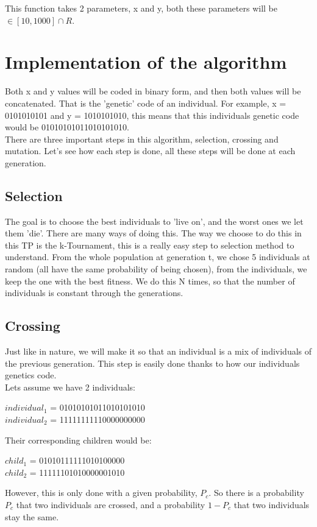 \documentclass[a4paper]{article}
\begin{document}
This function takes 2 parameters, x and y, both these parameters will be $\in [10,1000] \cap R$.

\section{Implementation of the algorithm}
Both x and y values will be coded in binary form, and then both values will be concatenated. That is the 'genetic' code of an individual. For example, {\color{red}x = 0101010101} and {\color{blue}y = 1010101010}, this means that this individuals genetic code would be {\color{red}0101010101}{\color{blue}1010101010}.\\
There are three important steps in this algorithm, selection, crossing and mutation. Let's see how each step is done, all these steps will be done at each generation.
\subsection{Selection}
The goal is to choose the best individuals to 'live on', and the worst ones we let them 'die'. There are many ways of doing this. The way we choose to do this in this TP is the k-Tournament, this is a really easy step to selection method to understand. From the whole population at generation t, we chose 5 individuals at random (all have the same probability of being chosen), from the individuals, we keep the one with the best fitness. We do this N times, so that the number of individuals is constant through the generations.
\subsection{Crossing}
Just like in nature, we will make it so that an individual is a mix of individuals of the previous generation. This step is easily done thanks to how our individuals genetics code.\\
Lets assume we have 2 individuals:\\
\begin{center}
$individual_1$ = {\color{red}0101010101}{\color{blue}1010101010}\\
$individual_2$ = {\color{purple}1111111111}{\color{brown}0000000000}\\
\end{center}
Their corresponding children would be:
\begin{center}
$child_1$ = {\color{red}01010}{\color{purple}11111}{\color{blue}10101}{\color{brown}00000}\\
$child_2$ = {\color{purple}11111}{\color{red}10101}{\color{brown}00000}{\color{blue}01010}\\
\end{center}
However, this is only done with a given probability, $P_c$. So there is a probability $P_c$ that two individuals are crossed, and a probability $1-P_c$ that two individuals stay the same.
\end{document}
